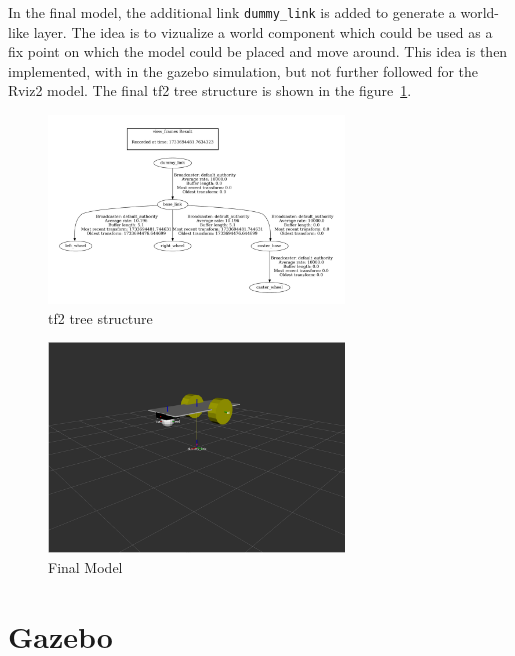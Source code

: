 \clearpage

In the final model, the additional link \verb|dummy_link| is added to generate a world-like layer. The idea is to vizualize a world component which could be used as a fix point on which the model could be placed and move around. This idea is then implemented, with in the gazebo simulation, but not further followed for the Rviz2 model. The final tf2 tree structure is shown in the figure~\ref{fig:tf_tree}.

\begin{figure}
    \centering
    \includegraphics[width=0.7\textwidth]{Figures/frames_2024-12-08_22.48.01.pdf}
    \caption{tf2 tree structure}
    \label{fig:tf_tree}

\end{figure}

\begin{figure}
    \centering
    \includegraphics[width=0.7\textwidth]{Figures/final_model.png}
    \caption{Final Model}

\end{figure}


\clearpage

\section{Gazebo}

